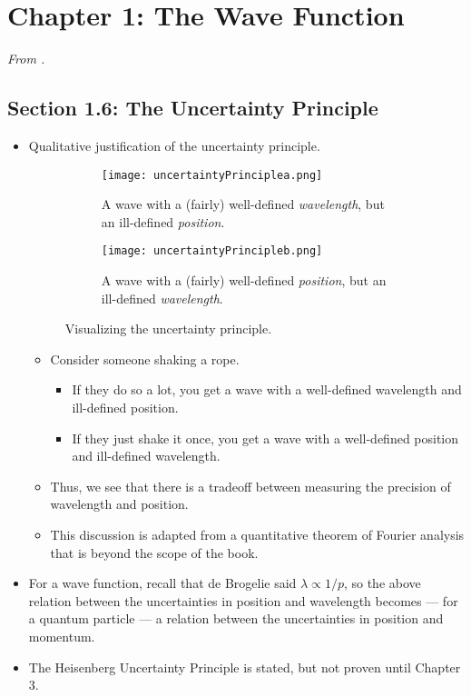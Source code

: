 \documentclass[../notes.tex]{subfiles}
\begin{document}
\section{Chapter 1: The Wave Function}
\emph{From \textcite{bib:Griffiths}.}
\subsection*{Section 1.6: The Uncertainty Principle}
\begin{itemize}
    \item {}Qualitative justification of the uncertainty principle.
    \begin{figure}[h!]
        \centering
        \begin{subfigure}[b]{\linewidth}
            \centering
            \texttt{[image: uncertaintyPrinciplea.png]}
            \caption{A wave with a (fairly) well-defined \emph{wavelength}, but an ill-defined \emph{position}.}
            \label{fig:uncertaintyPrinciplea}
        \end{subfigure}
        \begin{subfigure}[b]{\linewidth}
            \centering
            \texttt{[image: uncertaintyPrincipleb.png]}
            \caption{A wave with a (fairly) well-defined \emph{position}, but an ill-defined \emph{wavelength}.}
            \label{fig:uncertaintyPrincipleb}
        \end{subfigure}
        \caption{Visualizing the uncertainty principle.}
        \label{fig:uncertaintyPrinciple}
    \end{figure}
    \begin{itemize}
        \item Consider someone shaking a rope.
        \begin{itemize}
            \item If they do so a lot, you get a wave with a well-defined wavelength and ill-defined position.
            \item If they just shake it once, you get a wave with a well-defined position and ill-defined wavelength.
        \end{itemize}
        \item Thus, we see that there is a tradeoff between measuring the precision of wavelength and position.
        \item This discussion is adapted from a quantitative theorem of Fourier analysis that is beyond the scope of the book.
    \end{itemize}
    \item For a wave function, recall that de Brogelie said $\lambda\propto 1/p$, so the above relation between the uncertainties in position and wavelength becomes --- for a quantum particle --- a relation between the uncertainties in position and momentum.
    \item The Heisenberg Uncertainty Principle is stated, but not proven until Chapter 3.
\end{itemize}
\end{document}

